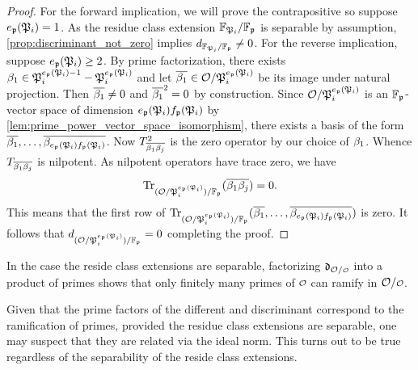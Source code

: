 \begin{proof}
      For the forward implication, we will prove the contrapositive so suppose \(e_{\mathfrak{p}}(\mathfrak{P}_{i}) = 1\). As the residue class extension \(\mathbb{F}_{\mathfrak{P}_{i}}/\mathbb{F}_{\mathfrak{p}}\) is separable by assumption, \cref{prop:discriminant_not_zero} implies \(d_{\mathbb{F}_{\mathfrak{P}_{i}}/\mathbb{F}_{\mathfrak{p}}} \neq 0\). For the reverse implication, suppose \(e_{\mathfrak{p}}(\mathfrak{P}_{i}) \ge 2\). By prime factorization, there exists \(\beta_{1} \in \mathfrak{P}_{i}^{e_{\mathfrak{p}}(\mathfrak{P}_{i})-1}-\mathfrak{P}_{i}^{e_{\mathfrak{p}}(\mathfrak{P}_{i})}\) and let \(\overline{\beta_{1}} \in \mathcal{O}/\mathfrak{P}_{i}^{e_{\mathfrak{p}}(\mathfrak{P}_{i})}\) be its image under natural projection. Then \(\overline{\beta_{1}} \neq 0\) and \(\overline{\beta_{1}}^{2} = 0\) by construction. Since \(\mathcal{O}/\mathfrak{P}_{i}^{e_{\mathfrak{p}}(\mathfrak{P}_{i})}\) is an \(\mathbb{F}_{\mathfrak{p}}\)-vector space of dimension \(e_{\mathfrak{p}}(\mathfrak{P}_{i})f_{\mathfrak{p}}(\mathfrak{P}_{i})\) by \cref{lem:prime_power_vector_space_isomorphism}, there exists a basis of the form \(\overline{\beta_{1}},\ldots,\overline{\beta_{e_{\mathfrak{p}}(\mathfrak{P}_{i})f_{\mathfrak{p}}(\mathfrak{P}_{i})}}\). Now \(T_{\overline{\beta_{1}}\overline{\beta_{j}}}^{2}\) is the zero operator by our choice of \(\beta_{1}\). Whence \(T_{\overline{\beta_{1}}\overline{\beta_{j}}}\) is nilpotent. As nilpotent operators have trace zero, we have
      \[
        \operatorname{\mathrm{Tr}}_{(\mathcal{O}/\mathfrak{P}_{i}^{e_{\mathfrak{p}}(\mathfrak{P}_{i})})/\mathbb{F}_{\mathfrak{p}}}(\overline{\beta_{1}\beta_{j}}) = 0.
      \]
      This means that the first row of \(\operatorname{\mathrm{Tr}}_{(\mathcal{O}/\mathfrak{P}_{i}^{e_{\mathfrak{p}}(\mathfrak{P}_{i})})/\mathbb{F}_{\mathfrak{p}}}(\overline{\beta_{1}},\ldots,\overline{\beta_{e_{\mathfrak{p}}(\mathfrak{P}_{i})f_{\mathfrak{p}}(\mathfrak{P}_{i})}})\) is zero. It follows that \(d_{(\mathcal{O}/\mathfrak{P}_{i}^{e_{\mathfrak{p}}(\mathfrak{P}_{i})})/\mathbb{F}_{\mathfrak{p}}} = 0\) completing the proof.
    \end{proof}

    In the case the reside class extensions are separable, factorizing \(\mf{d}_{\mc{O}/\smc{O}}\) into a product of primes shows that only finitely many primes of \(\smc{O}\) can ramify in \(\mc{O}/\smc{O}\).

    Given that the prime factors of the different and discriminant correspond to the ramification of primes, provided the residue class extensions are separable, one may suspect that they are related via the ideal norm. This turns out to be true regardless of the separability of the reside class extensions.

